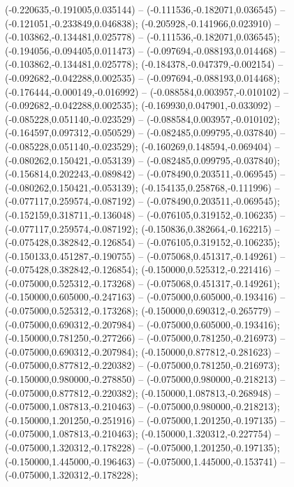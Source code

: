  (-0.220635,-0.191005,0.035144) -- (-0.111536,-0.182071,0.036545) -- (-0.121051,-0.233849,0.046838);
 (-0.205928,-0.141966,0.023910) -- (-0.103862,-0.134481,0.025778) -- (-0.111536,-0.182071,0.036545);
 (-0.194056,-0.094405,0.011473) -- (-0.097694,-0.088193,0.014468) -- (-0.103862,-0.134481,0.025778);
 (-0.184378,-0.047379,-0.002154) -- (-0.092682,-0.042288,0.002535) -- (-0.097694,-0.088193,0.014468);
 (-0.176444,-0.000149,-0.016992) -- (-0.088584,0.003957,-0.010102) -- (-0.092682,-0.042288,0.002535);
 (-0.169930,0.047901,-0.033092) -- (-0.085228,0.051140,-0.023529) -- (-0.088584,0.003957,-0.010102);
 (-0.164597,0.097312,-0.050529) -- (-0.082485,0.099795,-0.037840) -- (-0.085228,0.051140,-0.023529);
 (-0.160269,0.148594,-0.069404) -- (-0.080262,0.150421,-0.053139) -- (-0.082485,0.099795,-0.037840);
 (-0.156814,0.202243,-0.089842) -- (-0.078490,0.203511,-0.069545) -- (-0.080262,0.150421,-0.053139);
 (-0.154135,0.258768,-0.111996) -- (-0.077117,0.259574,-0.087192) -- (-0.078490,0.203511,-0.069545);
 (-0.152159,0.318711,-0.136048) -- (-0.076105,0.319152,-0.106235) -- (-0.077117,0.259574,-0.087192);
 (-0.150836,0.382664,-0.162215) -- (-0.075428,0.382842,-0.126854) -- (-0.076105,0.319152,-0.106235);
 (-0.150133,0.451287,-0.190755) -- (-0.075068,0.451317,-0.149261) -- (-0.075428,0.382842,-0.126854);
 (-0.150000,0.525312,-0.221416) -- (-0.075000,0.525312,-0.173268) -- (-0.075068,0.451317,-0.149261);
 (-0.150000,0.605000,-0.247163) -- (-0.075000,0.605000,-0.193416) -- (-0.075000,0.525312,-0.173268);
 (-0.150000,0.690312,-0.265779) -- (-0.075000,0.690312,-0.207984) -- (-0.075000,0.605000,-0.193416);
 (-0.150000,0.781250,-0.277266) -- (-0.075000,0.781250,-0.216973) -- (-0.075000,0.690312,-0.207984);
 (-0.150000,0.877812,-0.281623) -- (-0.075000,0.877812,-0.220382) -- (-0.075000,0.781250,-0.216973);
 (-0.150000,0.980000,-0.278850) -- (-0.075000,0.980000,-0.218213) -- (-0.075000,0.877812,-0.220382);
 (-0.150000,1.087813,-0.268948) -- (-0.075000,1.087813,-0.210463) -- (-0.075000,0.980000,-0.218213);
 (-0.150000,1.201250,-0.251916) -- (-0.075000,1.201250,-0.197135) -- (-0.075000,1.087813,-0.210463);
 (-0.150000,1.320312,-0.227754) -- (-0.075000,1.320312,-0.178228) -- (-0.075000,1.201250,-0.197135);
 (-0.150000,1.445000,-0.196463) -- (-0.075000,1.445000,-0.153741) -- (-0.075000,1.320312,-0.178228);
